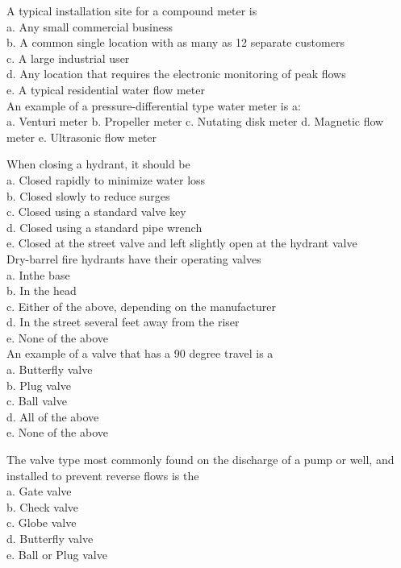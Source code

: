 A typical installation site for a compound meter is\\
a. Any small commercial business\\
b. A common single location with as many as 12 separate customers\\
c. A large industrial user\\
d. Any location that requires the electronic monitoring of peak flows\\
e. A typical residential water flow meter\\

An example of a pressure-differential type water meter is a:\\
a. Venturi meter
b. Propeller meter
c. Nutating disk meter
d. Magnetic flow meter
e. Ultrasonic flow meter

When closing a hydrant, it should be\\
a. Closed rapidly to minimize water loss\\
b. Closed slowly to reduce surges\\
c. Closed using a standard valve key\\
d. Closed using a standard pipe wrench\\
e. Closed at the street valve and left slightly open at the hydrant valve\\

Dry-barrel fire hydrants have their operating valves\\
a. Inthe base\\
b. In the head\\
c. Either of the above, depending on the manufacturer\\
d. In the street several feet away from the riser\\
e. None of the above\\

An example of a valve that has a 90 degree travel is a\\
a. Butterfly valve\\
b. Plug valve\\
c. Ball valve\\
d. All of the above\\
e. None of the above

The valve type most commonly found on the discharge of a pump or well, and installed to prevent reverse flows is the\\
a. Gate valve\\
b. Check valve\\
c. Globe valve\\
d. Butterfly valve\\
e. Ball or Plug valve\\


